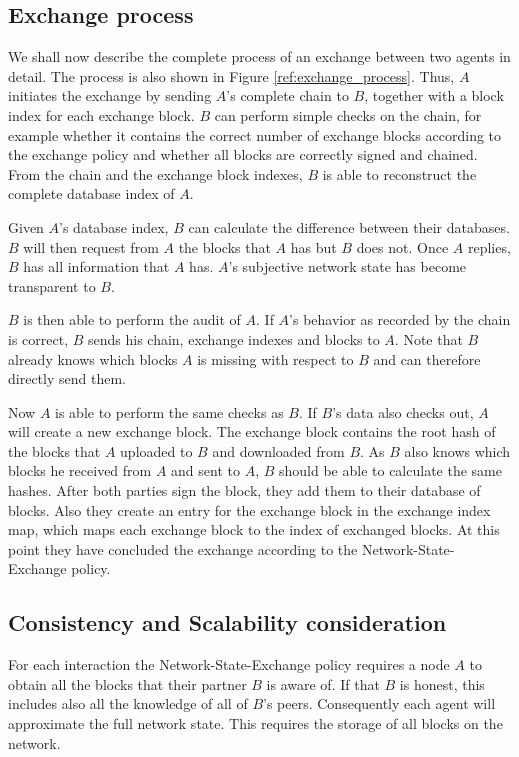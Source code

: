 \subsection{Exchange process}
We shall now describe the complete process of an exchange between two agents in detail. The process
is also shown in Figure \ref{ref:exchange_process}. Thus, $A$ 
initiates the exchange by sending $A$'s complete chain to $B$, together with a block index for each 
exchange block.
$B$ can perform simple checks on the chain, for example whether it contains the correct number of exchange blocks
according to the exchange policy and whether all blocks are correctly signed and chained. From the 
chain and the exchange block indexes, $B$ is able to reconstruct the complete database index of $A$.

Given $A$'s database index, $B$ can calculate the difference between their databases. $B$ will 
then request from $A$ the blocks that $A$ has but $B$ does not. Once $A$ replies, $B$ has all 
information that $A$ has. $A$'s subjective network state has become transparent to $B$. 

$B$ is then able to perform the audit of $A$. If $A$'s behavior as recorded by the chain is correct, 
$B$ sends his chain, exchange
indexes and blocks to $A$. Note that $B$ already knows which blocks $A$ is missing with respect to 
$B$ and can therefore directly send them. 

Now $A$ is able to perform the same checks as $B$. If $B$'s data also checks out, $A$ will create 
a new exchange block. The exchange block contains the root hash of the blocks that $A$ uploaded to $B$ 
and downloaded from $B$. As $B$ also knows which blocks he received from $A$ and sent to $A$, $B$ should
be able to calculate the same hashes. After both parties sign the block, they add them to their 
database of blocks. Also they create an entry for the exchange block in the exchange index map, which 
maps each exchange block to the index of exchanged blocks. At this point they have concluded the 
exchange according to the Network-State-Exchange policy.

\subsection{Consistency and Scalability consideration}
For each interaction the Network-State-Exchange policy requires a node $A$ to obtain all the blocks that
their partner $B$ is aware of. If that $B$ is honest, this includes also all the knowledge of all of
$B$'s peers. Consequently each agent will approximate the full network state. This requires the 
storage of all blocks on the network. 

